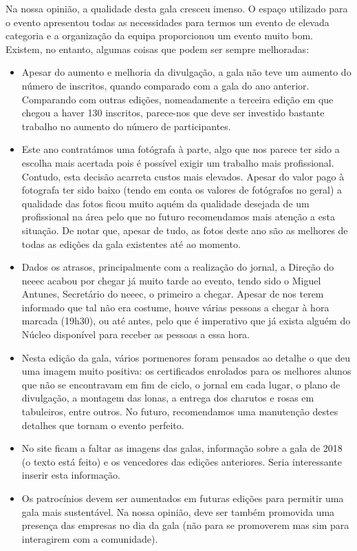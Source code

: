 Na nossa opinião, a qualidade desta gala cresceu imenso. O espaço utilizado para o evento apresentou todas as necessidades para termos um evento de elevada categoria e a organização da equipa proporcionou um evento muito bom. Existem, no entanto, algumas coisas que podem ser sempre melhoradas:
\begin{itemize}
\item Apesar do aumento e melhoria da divulgação, a gala não teve um aumento do número de inscritos, quando comparado com a gala do ano anterior. Comparando com outras edições, nomeadamente a terceira edição em que chegou a haver 130 inscritos, parece-nos que deve ser investido bastante trabalho no aumento do número de participantes.
\item Este ano contratámos uma fotógrafa à parte, algo que nos parece ter sido a escolha mais acertada pois é possível exigir um trabalho mais profissional. Contudo, esta decisão acarreta custos mais elevados. Apesar do valor pago à fotografa ter sido baixo (tendo em conta os valores de fotógrafos no geral) a qualidade das fotos ficou muito aquém da qualidade desejada de um profissional na área pelo que no futuro recomendamos mais atenção a esta situação. De notar que, apesar de tudo, as fotos deste ano são as melhores de todas as edições da gala existentes até ao momento.
\item Dados os atrasos, principalmente com a realização do jornal, a Direção do \acrshort{neeec} acabou por chegar já muito tarde ao evento, tendo sido o Miguel Antunes, Secretário do \acrshort{neeec}, o primeiro a chegar. Apesar de nos terem informado que tal não era costume, houve várias pessoas a chegar à hora marcada (19h30), ou até antes, pelo que é imperativo que já exista alguém do Núcleo disponível para receber as pessoas a essa hora.
\item Nesta edição da gala, vários pormenores foram pensados ao detalhe o que deu uma imagem muito positiva: os certificados enrolados para os melhores alunos que não se encontravam em fim de ciclo, o jornal em cada lugar, o plano de divulgação, a montagem das lonas, a entrega dos charutos e rosas em tabuleiros, entre outros. No futuro, recomendamos uma manutenção destes detalhes que tornam o evento perfeito.
\item No site ficam a faltar as imagens das galas, informação sobre a gala de 2018 (o texto está feito) e os vencedores das edições anteriores. Seria interessante inserir esta informação.
\item Os patrocínios devem ser aumentados em futuras edições para permitir uma gala mais sustentável. Na nossa opinião, deve ser também promovida uma presença das empresas no dia da gala (não para se promoverem mas sim para interagirem com a comunidade).

\end{itemize}
